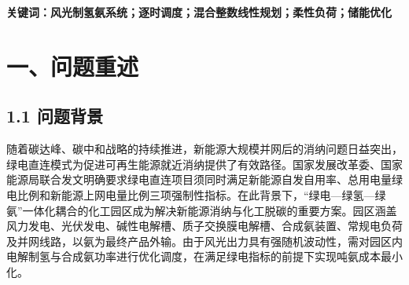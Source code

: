 \documentclass[zihao=-4,a4paper]{ctexart} %
\begin{document}
	\noindent \textbf{关键词：风光制氢氨系统；逐时调度；混合整数线性规划；柔性负荷；储能优化}
	
	\newpage
	
	
	\section*{一、问题重述}
	\subsection*{1.1 问题背景}
	
	随着碳达峰、碳中和战略的持续推进，新能源大规模并网后的消纳问题日益突出，绿电直连模式为促进可再生能源就近消纳提供了有效路径。国家发展改革委、国家能源局联合发文\cite{4}明确要求绿电直连项目须同时满足新能源自发自用率、总用电量绿电比例和新能源上网电量比例三项强制性指标。在此背景下，“绿电—绿氢—绿氨”一体化耦合的化工园区成为解决新能源消纳与化工脱碳的重要方案。园区涵盖风力发电、光伏发电、碱性电解槽、质子交换膜电解槽、合成氨装置、常规电负荷及并网线路，以氨为最终产品外输。由于风光出力具有强随机波动性，需对园区内电解制氢与合成氨功率进行优化调度，在满足绿电指标的前提下实现吨氨成本最小化。
	
\end{document}
